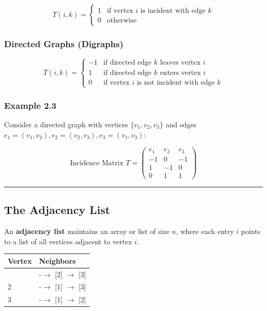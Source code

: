 \documentclass[
]{book}
\newcounter{none} %
\theoremstyle{definition}
\theoremstyle{definition}
\theoremstyle{definition}
\theoremstyle{definition}
\theoremstyle{remark}
\begin{document}
\[T(i, k) = \begin{cases} 1 & \text{if vertex } i \text{ is incident with edge } k \\ 0 & \text{otherwise} \end{cases}\]

\subsubsection{Directed Graphs (Digraphs)}\label{directed-graphs-digraphs-1}

\[T(i, k) = \begin{cases} -1 & \text{if directed edge } k \text{ leaves vertex } i \\ 1 & \text{if directed edge } k \text{ enters vertex } i \\ 0 & \text{if vertex } i \text{ is not incident with edge } k \end{cases}\]

\subsubsection{Example 2.3}\label{example-2.3}

Consider a directed graph with vertices \(\{v_1, v_2, v_3\}\) and edges \(e_1 = (v_1, v_2), e_2 = (v_2, v_3), e_3 = (v_1, v_3)\):

\[\text{Incidence Matrix } T = \begin{pmatrix}  e_1 & e_2 & e_3 \\ -1 & 0 & -1 \\  1 & -1 & 0 \\  0 & 1 & 1  \end{pmatrix}\]

\begin{center}\rule{0.5\linewidth}{0.5pt}\end{center}

\subsection{The Adjacency List}\label{the-adjacency-list}

An \textbf{adjacency list} maintains an array or list of size \(n\), where each entry \(i\) points to a list of all vertices adjacent to vertex \(i\).

{\def\LTcaptype{none} %
\begin{longtable}[]{@{}ll@{}}
\toprule\noalign{}
Vertex & Neighbors \\
\midrule\noalign{}
\endhead
\bottomrule\noalign{}
\endlastfoot
1 & -\(\rightarrow\) {[}2{]} \(\rightarrow\) {[}3{]} \\
2 & -\(\rightarrow\) {[}1{]} \(\rightarrow\) {[}3{]} \\
3 & -\(\rightarrow\) {[}1{]} \(\rightarrow\) {[}2{]} \\
\end{longtable}
}
\end{document}
